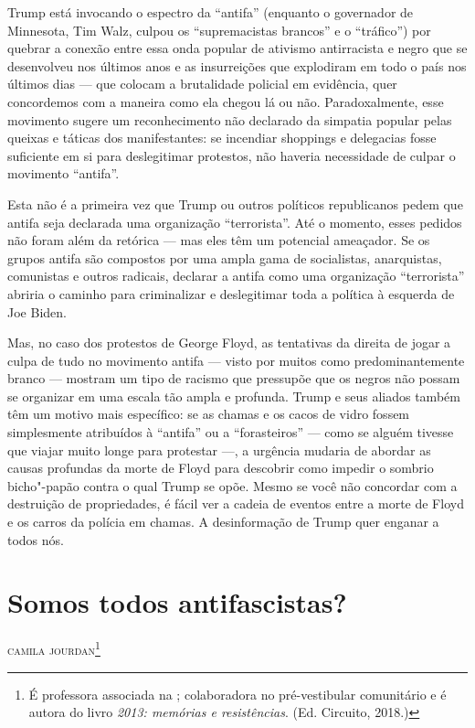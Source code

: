 Trump está invocando o espectro da ``antifa'' (enquanto o governador de Minnesota, Tim Walz, culpou os ``supremacistas brancos'' e o ``tráfico'') por quebrar a conexão entre essa onda popular de ativismo antirracista e negro que se desenvolveu nos últimos anos e as insurreições que explodiram em todo o país nos últimos dias — que colocam a brutalidade policial em evidência, quer concordemos com a maneira como ela chegou lá ou não. Paradoxalmente, esse movimento sugere um reconhecimento não declarado da simpatia popular pelas queixas e táticas dos manifestantes: se incendiar shoppings e delegacias fosse suficiente em si para deslegitimar protestos, não haveria necessidade de culpar o movimento ``antifa''.
 
Esta não é a primeira vez que Trump ou outros políticos republicanos pedem que antifa seja declarada uma organização ``terrorista''. Até o momento, esses pedidos não foram além da retórica — mas eles têm um potencial ameaçador. Se os grupos antifa são compostos por uma ampla gama de socialistas, anarquistas, comunistas e outros radicais, declarar a antifa como uma organização ``terrorista'' abriria o caminho para criminalizar e deslegitimar toda a política à esquerda de Joe Biden.
 
Mas, no caso dos protestos de George Floyd, as tentativas da direita de jogar a culpa de tudo no movimento antifa — visto por muitos como predominantemente branco — mostram um tipo de racismo que pressupõe que os negros não possam se organizar em uma escala tão ampla e profunda. Trump e seus aliados também têm um motivo mais específico: se as chamas e os cacos de vidro fossem simplesmente atribuídos à ``antifa'' ou a ``forasteiros'' — como se alguém tivesse que viajar muito longe para protestar —, a urgência mudaria de abordar as causas profundas da morte de Floyd para descobrir como impedir o sombrio bicho"-papão contra o qual Trump se opõe. Mesmo se você não concordar com a destruição de propriedades, é fácil ver a cadeia de eventos entre a morte de Floyd e os carros da polícia em chamas. A desinformação de Trump quer enganar a todos nós.



\chapter[Somos todos antifascistas?]{Somos todos antifascistas? }

\hfill{}\textsc{camila jourdan}\footnote[\dag]{É professora associada na ; colaboradora no pré-vestibular
  comunitário  e é autora do livro \emph{2013: memórias e resistências}. (Ed.
  Circuito, 2018.)}

